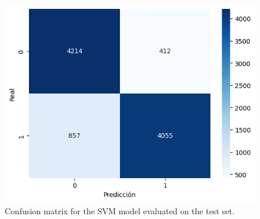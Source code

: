 \begin{figure}[H]
    \centering
    \includegraphics[width=\linewidth]{images/ConfusionMatrixSVMTestSet.png}
    \caption{Confusion matrix for the SVM model evaluated on the test set.}
    \label{fig:confusion_matrix_svm}
\end{figure}